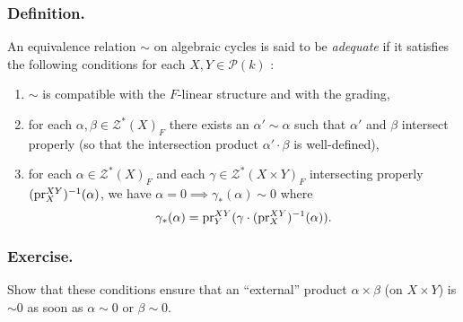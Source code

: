 \documentclass[../main.tex]{subfiles}
\begin{document}
\subsubsection{Definition.} An equivalence relation $\sim$ on algebraic cycles is said to be \emph{adequate} if it satisfies the following conditions for each $X, Y \in \mathcal{P}(k)$ :
\begin{enumerate}[label=\arabic*)]
    \item $\sim$ is compatible with the $F$-linear structure and with the grading,
    \item for each $\alpha, \beta \in \mathcal{Z}^*(X)_F$ there exists an $\alpha' \sim \alpha$ such that $\alpha'$ and $\beta$ intersect properly (so that the intersection product $\alpha' \cdot \beta$ is well-defined),
    \item for each $\alpha \in \mathcal{Z}^*(X)_F$ and each $\gamma \in \mathcal{Z}^*(X \times Y)_F$ intersecting properly $(\mathrm{pr}^{XY}_X)^{-1}(\alpha)$, we have $\alpha = 0 \implies \gamma_*(\alpha) \sim 0$ where
    $$\gamma_*(\alpha) = \mathrm{pr}^{XY}_Y(\gamma \cdot (\mathrm{pr}^{XY}_X)^{-1}(\alpha)).$$
\end{enumerate}

\subsubsection{Exercise.} Show that these conditions ensure that an \enquote{external} product $\alpha \times \beta$ (on $X \times Y$) is $\sim 0$ as soon as $\alpha \sim 0$ or $\beta \sim 0$.
\end{document}
